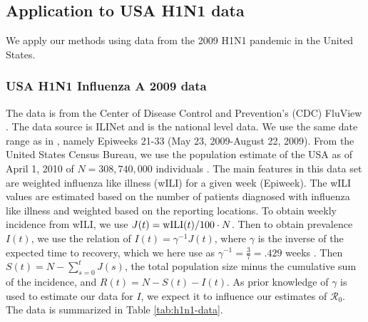 \documentclass[12pt]{article}
\newcommand{\rr}{\ensuremath{\mathcal{R}_0}}
\begin{document}
      \subsection{Application to USA H1N1 data}\label{sec:real-data}
      We apply our methods using data from the 2009 H1N1 pandemic in the United States.

      \subsubsection{USA H1N1 Influenza A 2009 data}
      The data is from the Center of Disease Control and Prevention's (CDC) FluView \citep{cdc-fluview}.  The data source is ILINet and is the national level data.  We use the same date range as in \cite{towers2009}, namely Epiweeks 21-33 (May 23, 2009-August 22, 2009).  From the United States Census Bureau, we use the population estimate of the USA as of April 1, 2010 of $N=308,740,000$ individuals \citep{census-2010}.  The main features in this data set are weighted influenza like illness (wILI) for a given week (Epiweek).  The wILI values are estimated based on the number of patients diagnosed with influenza like illness and weighted based on the reporting locations.  To obtain weekly incidence from wILI, we use $J(t) = \textnormal{wILI}(t) / 100 \cdot N$.  Then to obtain prevalence $I(t)$, we use the relation of $I(t) = \gamma^{-1}J(t)$, where $\gamma$ is the inverse of the expected time to recovery, which we here use as $\gamma^{-1} = \frac{3}{7}=.429$ weeks \citep{vespignani2007}.  Then $S(t) = N - \sum_{s=0}^{t}J(s)$, the total population size minus the cumulative sum of the incidence, and $R(t) = N - S(t) - I(t)$.  As prior knowledge of $\gamma$ is used to estimate our data for $I$, we expect it to influence our estimates of $\rr$.  The data is summarized in Table \ref{tab:h1n1-data}.
\end{document}
